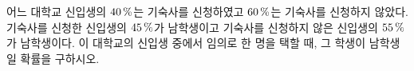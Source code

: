 어느 대학교 신입생의 $40\mkern3mu \%$는 기숙사를 신청하였고 $60\mkern3mu \%$는 기숙사를 신청하지 않았다. 기숙사를 신청한 신입생의 $45\mkern3mu \%$가 남학생이고 기숙사를 신청하지 않은 신입생의 $55\mkern3mu \%$가 남학생이다. 이 대학교의 신입생 중에서 임의로 한 명을 택할 때, 그 학생이 남학생일 확률을 구하시오.
